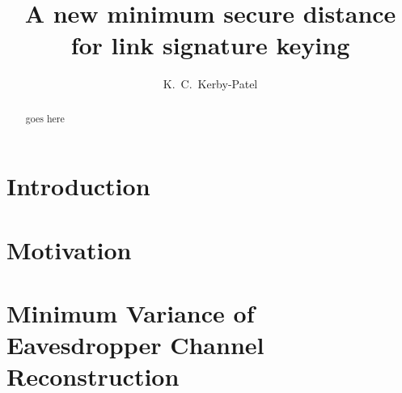 \documentclass{ieeetran}
\title{A new minimum secure distance for link signature keying}
\author{K.~C.~Kerby-Patel}
\date{}
\begin{document}
\begin{abstract}goes here\end{abstract}
\section{Introduction}
\section{Motivation}
	


\section{Minimum Variance of Eavesdropper Channel Reconstruction}
\end{document}
